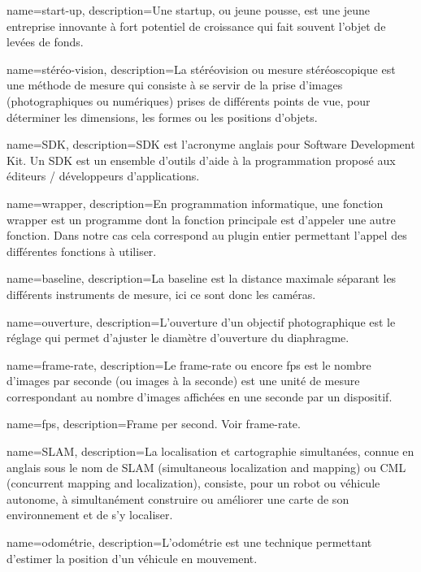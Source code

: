 {
	name=start-up,
	description={Une startup, ou jeune pousse, est une jeune entreprise innovante à fort potentiel de croissance qui fait souvent l'objet de levées de fonds.}
}

{
	name=stéréo-vision,
	description={La stéréovision ou mesure stéréoscopique est une méthode de mesure qui consiste à se servir de la prise d'images (photographiques ou numériques) prises de différents points de vue, pour déterminer les dimensions, les formes ou les positions d'objets.}
}

{
	name=SDK,
	description={SDK est l'acronyme anglais pour Software Development Kit. Un SDK est un ensemble d'outils d'aide à la programmation proposé aux éditeurs / développeurs d'applications.}
}

{
	name=wrapper,
	description={En programmation informatique, une fonction wrapper est un programme dont la fonction principale est d'appeler une autre fonction. Dans notre cas cela correspond au plugin entier permettant l'appel des différentes fonctions à utiliser.}
}


{
	name=baseline,
	description={La baseline est la distance maximale séparant les différents instruments de mesure, ici ce sont donc les caméras.}
}

{
	name=ouverture,
	description={L'ouverture d'un objectif photographique est le réglage qui permet d'ajuster le diamètre d'ouverture du diaphragme.}
}


{
	name=frame-rate,
	description={Le frame-rate ou encore fps est le nombre d'images par seconde (ou images à la seconde) est une unité de mesure correspondant au nombre d'images affichées en une seconde par un dispositif.}
}

{
	name=fps,
	description={Frame per second. Voir frame-rate.}
}

{
	name=SLAM,
	description={La localisation et cartographie simultanées, connue en anglais sous le nom de SLAM (simultaneous localization and mapping) ou CML (concurrent mapping and localization), consiste, pour un robot ou véhicule autonome, à simultanément construire ou améliorer une carte de son environnement et de s’y localiser.}
}

{
	name=odométrie,
	description={L’odométrie est une technique permettant d'estimer la position d'un véhicule en mouvement. }
}

